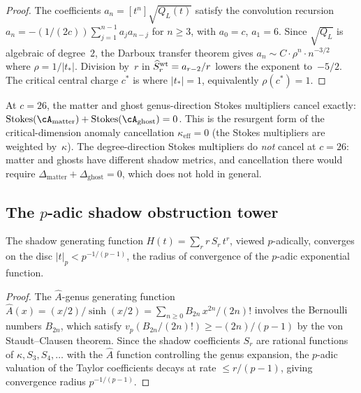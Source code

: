 \begin{proof}
The coefficients $a_n = [t^n]\sqrt{Q_L(t)}$ satisfy
the convolution recursion
$a_n = -(1/(2c))\sum_{j=1}^{n-1} a_j a_{n-j}$ for
$n \geq 3$, with $a_0 = c$, $a_1 = 6$.
Since $\sqrt{Q_L}$ is algebraic of degree~$2$, the
Darboux transfer theorem gives
$a_n \sim C \cdot \rho^n \cdot n^{-3/2}$ where
$\rho = 1/|t_*|$. Division by~$r$ in
$\widehat S^{\rm wt}_r = a_{r-2}/r$
lowers the exponent to~$-5/2$. The critical central
charge $c^*$ is where $|t_*| = 1$, equivalently
$\rho(c^*) = 1$.
\end{proof}

\begin{remark}[Resurgent anomaly cancellation at $c = 26$]%
\label{rem:resurgent-anomaly-cancellation}%
\ClaimStatusHeuristic%
%
%
At $c = 26$, the matter and ghost genus-direction
Stokes multipliers cancel exactly:
$\mathrm{Stokes}(\cA_{\mathrm{matter}}) +
\mathrm{Stokes}(\cA_{\mathrm{ghost}}) = 0$.
This is the resurgent form of the critical-dimension
anomaly cancellation $\kappa_{\mathrm{eff}} = 0$
(the Stokes multipliers are weighted by~$\kappa$).
The degree-direction Stokes multipliers do \emph{not}
cancel at $c = 26$: matter and ghosts have different
shadow metrics, and cancellation there would require
$\Delta_{\mathrm{matter}} + \Delta_{\mathrm{ghost}} = 0$,
which does not hold in general.
\end{remark}

\subsection{The $p$-adic shadow obstruction tower}%
\label{subsec:padic-shadow-tower}

\begin{proposition}%
\label{prop:padic-convergence}%
%
%
The shadow generating function $H(t) = \sum_r r\,S_r\,t^r$,
viewed $p$-adically, converges on the disc
$|t|_p < p^{-1/(p-1)}$, the radius of convergence of the
$p$-adic exponential function.
\end{proposition}

\begin{proof}
The $\hat{A}$-genus generating function
$\hat{A}(x) = (x/2)/\sinh(x/2) =
\sum_{n \geq 0} B_{2n}\, x^{2n} / (2n)!$
involves the Bernoulli numbers $B_{2n}$, which satisfy
$v_p(B_{2n}/(2n)!) \geq -(2n)/(p{-}1)$ by the
von Staudt--Clausen theorem. Since the shadow
coefficients $S_r$ are rational functions of
$\kappa, S_3, S_4, \ldots$ with the $\hat{A}$ function
controlling the genus expansion, the $p$-adic valuation
of the Taylor coefficients decays at rate $\leq r/(p{-}1)$,
giving convergence radius
$p^{-1/(p-1)}$.
\end{proof}

